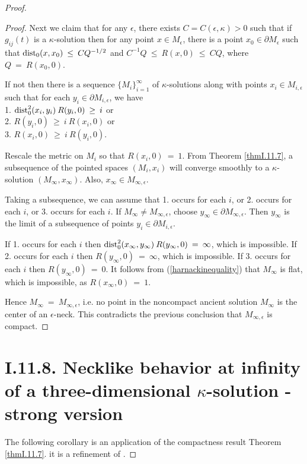 \begin{proof}
\begin{proof}
Next we claim that for any $\epsilon$, there exists
$C = C(\epsilon, \kappa) > 0$ such that if $g_{ij}(t)$ is a $\kappa$-solution
then for
any point $x \in M_\epsilon$, there is a point $x_0 \in
\partial M_\epsilon$ such that $\operatorname{dist}_0(x, x_0) \: \le \: CQ^{-1/2}$
and $C^{-1} Q \: \le \: R(x, 0) \: \le \: CQ$, where
$Q \: = \: R(x_0, 0)$.

If not then there is a sequence $\{M_i\}_{i=1}^\infty$
of $\kappa$-solutions along with points
$x_i \in M_{i,\epsilon}$ such that for each $y_i \in
\partial M_{i,\epsilon}$, we have \\
1. $\operatorname{dist}_0^2(x_i, y_i) \: R(y_i, 0) \: \ge \: i$ or \\
2. $R(y_i, 0) \: \ge \: i \: R(x_i, 0)$ or \\
3. $R(x_i, 0) \: \ge \: i \: R(y_i, 0)$.

Rescale the metric on $M_i$ so that $R(x_i, 0) \: = \: 1$. From
Theorem \ref{thmI.11.7}, a subsequence of the pointed spaces
$(M_i, x_i)$ will converge smoothly to a $\kappa$-solution
$(M_\infty, x_\infty)$. Also, $x_\infty \in M_{\infty, \epsilon}$.

Taking a subsequence, we
can assume that 1. occurs for each $i$, or 2. occurs for each $i$,
or 3. occurs for each $i$. If $M_\infty \neq M_{\infty, \epsilon}$,
choose $y_\infty \in
\partial M_{\infty,\epsilon}$. Then $y_\infty$ is the limit of
a subsequence of points $y_i \in \partial M_{i,\epsilon}$.

If 1. occurs for each $i$ then $\operatorname{dist}_0^2(x_\infty, y_\infty) \:
R(y_\infty, 0) \: = \: \infty$, which is impossible.
If 2. occurs for each $i$ then $R(y_\infty, 0) \: = \: \infty$, which
is impossible.
If 3. occurs for each $i$ then $R(y_\infty, 0) \: = \: 0$.
It follows from (\ref{harnackinequality}) that $M_\infty$ is flat,
which is impossible, as $R(x_\infty, 0) \: = \: 1$.

Hence $M_\infty \: = \: M_{\infty,\epsilon}$, i.e. no point in the
noncompact ancient solution $M_\infty$ is the center of an $\epsilon$-neck.
This contradicts the previous conclusion that
$M_{\infty,\epsilon}$ is compact.
\end{proof}

\section{I.11.8. Necklike behavior at infinity of a three-dimensional
$\kappa$-solution - strong version}
\label{strongversion}

The following corollary is an application of the compactness result
Theorem \ref{thmI.11.7}.
it is a refinement of
\cite[Cor. I.11.8]{Perelman}.


\end{proof}
